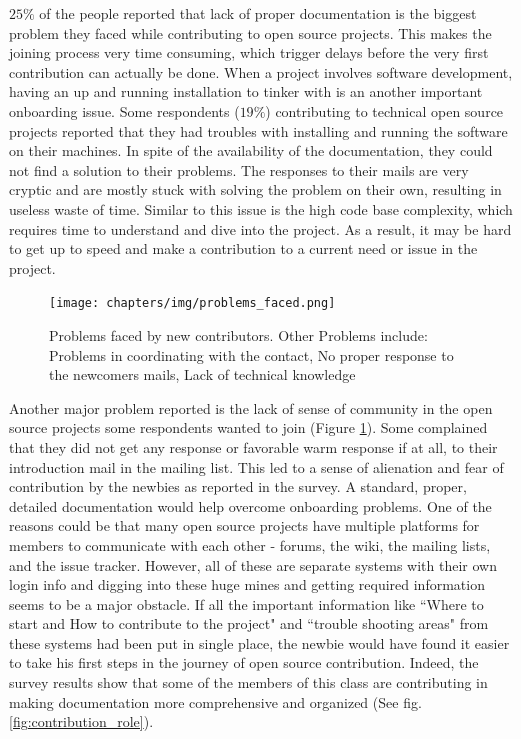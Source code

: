 $25\%$ of the people reported that lack of proper documentation is the biggest problem they faced while contributing to open source projects. This makes the joining process very time consuming, which trigger delays before the very first contribution can actually be done. When a project involves software development,  having an up and running installation to tinker with is an another important onboarding issue. Some respondents ($19\%$) contributing to technical open source projects reported that they had troubles with installing and running the software on their machines. In spite of the availability of the documentation, they could not find a solution to their problems. The responses to their mails are very cryptic and are mostly stuck with solving the problem on their own, resulting in useless waste of time. Similar to this issue is the high code base complexity, which requires time to understand and dive into the project. As a result, it may be hard to get up to speed and make a contribution to a current need or issue in the project.

\begin{figure}[ht!]
\centering
\texttt{[image: chapters/img/problems\_faced.png]}
\caption{Problems faced by new contributors. Other Problems include: Problems in coordinating with the contact, No proper response to the newcomers mails, Lack of technical knowledge}
\label{fig:problem_faced}
\end{figure}


\noindent Another major problem reported is the lack of sense of community in the open source projects some respondents wanted to join (Figure \ref{fig:problem_faced}). Some complained that they did not get any response or favorable warm response if at all, to their introduction mail in the mailing list. This led to a sense of alienation and fear of contribution by the newbies as reported in the survey. A standard, proper, detailed documentation  would help overcome onboarding problems. One of the reasons could be  that many open source projects have multiple platforms for members to communicate with each other - forums, the wiki, the mailing lists, and the issue tracker. However, all of these are separate systems with their own login info and digging into these huge mines and getting required information seems to be a major obstacle. If all the important information like ``Where to start and How to contribute to the project" and ``trouble shooting areas" from these systems had been put in single place, the newbie would have found it easier to take his first steps in the journey of open source contribution. Indeed, the survey results show that some of the members of this class are contributing in making documentation more comprehensive and organized (See fig. \ref{fig:contribution_role}).


